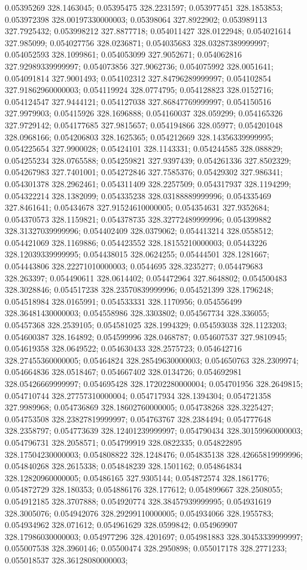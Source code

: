 0.05395269 328.1463045; 0.05395475 328.2231597; 0.053977451 328.1853853; 0.053972398 328.00197330000003; 0.05398064 327.8922902; 0.053989113 327.7925432; 0.053998212 327.8877718; 0.054011427 328.0122948; 0.054021614 327.985099; 0.054027756 328.0236871; 0.054035683 328.03287389999997; 0.054052593 328.1099861; 0.054053099 327.9052671; 0.054062816 327.92989339999997; 0.054073856 327.9062736; 0.054075992 328.0051641; 0.054091814 327.9001493; 0.054102312 327.84796289999997; 0.054102854 327.91862960000003; 0.054119924 328.0774795; 0.054128823 328.0152716; 0.054124547 327.9444121; 0.054127038 327.86847769999997; 0.054150516 327.9979903; 0.05415926 328.1696888; 0.054160037 328.059299; 0.054165326 327.9729142; 0.054177685 327.9815657; 0.054194866 328.05977; 0.054201048 328.0968166; 0.054206803 328.1625365; 0.054212669 328.14356339999995; 0.054225654 327.9900028; 0.05424101 328.1143331; 0.054244585 328.088829; 0.054255234 328.0765588; 0.054259821 327.9397439; 0.054261336 327.8502329; 0.054267983 327.7401001; 0.054272846 327.7585376; 0.05429302 327.986341; 0.054301378 328.2962461; 0.054311409 328.2257509; 0.054317937 328.1194299; 0.054322214 328.1382099; 0.054335238 328.03188889999996; 0.054335469 327.8461641; 0.05434678 327.91524610000005; 0.054354631 327.9352684; 0.054370573 328.1159821; 0.054378735 328.32772489999996; 0.054399882 328.31327039999996; 0.054402409 328.0379062; 0.054413214 328.0558512; 0.054421069 328.1169886; 0.054423552 328.18155210000003; 0.05443226 328.12039339999995; 0.054438015 328.0624255; 0.05444501 328.1281667; 0.054443806 328.22271010000003; 0.0544695 328.3235277; 0.054479683 328.263397; 0.054490611 328.0614402; 0.054472964 327.8648802; 0.054500483 328.3028846; 0.054517238 328.23570839999996; 0.054521399 328.1796248; 0.054518984 328.0165991; 0.054533331 328.1170956; 0.054556499 328.36481430000003; 0.054558986 328.3303802; 0.054567734 328.336055; 0.05457368 328.2539105; 0.054581025 328.1994329; 0.054593038 328.1123203; 0.054600387 328.164892; 0.054599996 328.0468787; 0.054607537 327.9810945; 0.054619358 328.0649522; 0.054630433 328.2575723; 0.054642716 328.27455360000005; 0.05464824 328.28549630000003; 0.054650763 328.2309974; 0.054664836 328.0518467; 0.054667402 328.0134726; 0.054692981 328.05426669999997; 0.054695428 328.17202280000004; 0.054701956 328.2649815; 0.054710744 328.27757310000004; 0.054717934 328.1394304; 0.054721358 327.9989968; 0.054736869 328.18602760000005; 0.054738268 328.3225427; 0.054753508 328.23827819999997; 0.054763767 328.2384494; 0.054777648 328.2358797; 0.054773639 328.12401239999997; 0.054790434 328.30159960000003; 0.054796731 328.2058571; 0.054799919 328.0822335; 0.054822895 328.17504230000003; 0.054808822 328.1248476; 0.054835138 328.42665819999996; 0.054840268 328.2615338; 0.054848239 328.1501162; 0.054864834 328.12820960000005; 0.05486165 327.9305144; 0.054872574 328.1861776; 0.054872729 328.180353; 0.054886176 328.177612; 0.054899667 328.2508055; 0.054912185 328.3707888; 0.054920774 328.38457939999995; 0.054931619 328.3005076; 0.054942076 328.29299110000005; 0.054934066 328.1955783; 0.054934962 328.071612; 0.054961629 328.0599842; 0.054969907 328.17986030000003; 0.054977296 328.4201697; 0.054981883 328.30453339999997; 0.055007538 328.3960146; 0.05500474 328.2950898; 0.055017178 328.2771233; 0.055018537 328.36128080000003; 